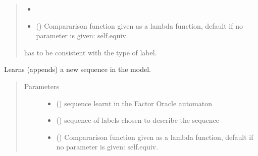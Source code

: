 \documentclass[letterpaper,10pt,english]{sphinxmanual}
\begin{document}
\begin{fulllineitems}
\begin{fulllineitems}
\begin{quote}
\begin{description}
\begin{itemize}
\item {} 
 \textendash{} 

\item {} 
 () \textendash{} Compararison function given as a lambda function, default if no parameter is given: self.equiv.

\end{itemize}

\item[{!}] \leavevmode
{} has to be consistent with the type of label.

\end{description}\end{quote}

\end{fulllineitems}


\begin{fulllineitems}
\label{\detokenize{index:Model.Model.learn_sequence}}
Learns (appends) a new sequence in the model.
\begin{quote}\begin{description}
\item[{Parameters}] \leavevmode\begin{itemize}
\item {} 
 () \textendash{} sequence learnt in the Factor Oracle automaton

\item {} 
 () \textendash{} sequence of labels chosen to describe the sequence

\item {} 
 () \textendash{} Compararison function given as a lambda function, default if no parameter is given: self.equiv.

\end{itemize}


\end{description}
\end{quote}
\end{fulllineitems}
\end{fulllineitems}
\end{document}
